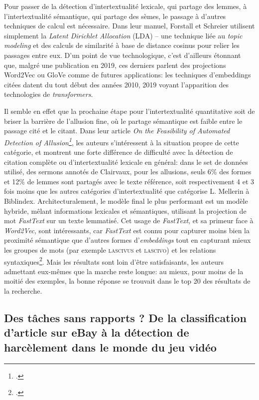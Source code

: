 Pour passer de la détection d'intertextualité lexicale, qui partage des lemmes, à l'intertextualité sémantique, qui partage des sèmes, le passage à d'autres techniques de calcul est nécessaire. Dans leur manuel, Forstall et Schreier utilisent simplement la \textit{Latent Dirichlet Allocation} (LDA) -- une technique liée au \textit{topic modeling} et des calculs de similarité à base de distance cosinus pour relier les passages entre eux. D'un point de vue technologique, c'est d'ailleurs étonnant que, malgré une publication en 2019, ces derniers parlent des projections Word2Vec ou GloVe comme de futures applications: les techniques d'embeddings citées datent du tout début des années 2010, 2019 voyant l'apparition des technologies de \textit{transformers}. 

Il semble en effet que la prochaine étape pour l'intertextualité quantitative soit de briser la barrière de l'allusion fine, où le partage sémantique est faible entre le passage cité et le citant. Dans leur article \textit{On the Feasibility of Automated Detection of Allusion\footcite{manjavacas_feasibility_2019}}, les auteurs s'intéressent à la situation propre de cette catégorie, et montrent une forte différence de difficulté avec la détection de citation complète ou d'intertextualité lexicale en général: dans le set de données utilisé, des sermons annotés de Clairvaux, pour les allusions, seuls 6\% des formes et 12\% de lemmes sont partagés avec le texte référence, soit respectivement 4 et 3 fois moins que les autres catégories d'intertextualité que catégorise L. Mellerin à Biblindex. Architecturalement, le modèle final le plus performant est un modèle hybride, mêlant informations lexicales et sémantiques, utilisant la projection de mot \textit{FastText} sur un texte lemmatisé. Cet usage de \textit{FastText}, et sa primeur face à \textit{Word2Vec}, sont intéressants, car \textit{FastText} est connu pour capturer moins bien la proximité sémantique que d'autres formes d'\textit{embeddings} tout en capturant mieux les groupes de mots (par exemple \textsc{lascivus} et \textsc{lascivo}) et les relations syntaxiques\footcite{hartmann_portuguese_nodate}. Mais les résultats sont loin d'être satisfaisants, les auteurs admettant eux-mêmes que la marche reste longue: au mieux, pour moins de la moitié des exemples, la bonne réponse se trouvait dans le top 20 des résultats de la recherche. 


\subsection{Des tâches sans rapports ? De la classification d'article sur eBay à la détection de harcèlement dans le monde du jeu vidéo}

